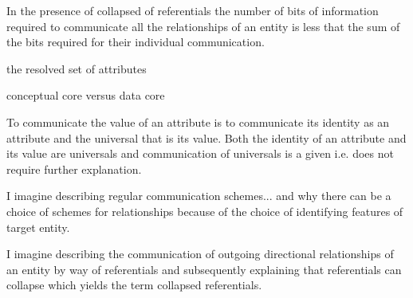 \mynote In the presence of collapsed of referentials the number of bits of information required to communicate all the relationships of an entity is less that the sum of the bits required for their individual communication. 

\mynote the resolved set of attributes

\mynote conceptual core versus data core

\begin{oldtt}
\mynote To communicate the value of an attribute is to communicate its identity as an attribute and the universal that is its value. Both the identity of an attribute and its value are universals and communication of universals is a given i.e. does not require further explanation. 
\end{oldtt}

\begin{noteforfuture}
I imagine describing regular communication schemes... and why there can be a choice of schemes for relationships because of the choice of identifying features of target entity. 
\end{noteforfuture}
\begin{noteforfuture}
I imagine describing the communication of outgoing directional relationships of an entity by way of referentials and subsequently explaining that referentials can collapse which yields the term collapsed referentials.
\end{noteforfuture}